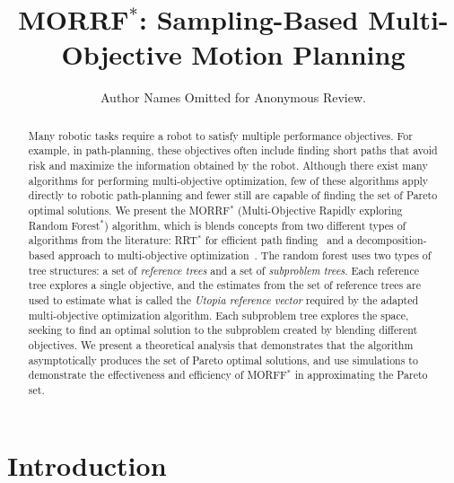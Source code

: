 \documentclass{article}
\title{ MORRF$^*$: Sampling-Based Multi-Objective Motion Planning }
\author{Author Names Omitted for Anonymous Review.}
\begin{document}
\maketitle

\begin{abstract}
Many robotic tasks require a robot to satisfy multiple performance objectives.  
For example, in path-planning, these objectives often include finding short paths that avoid risk and maximize the information obtained by the robot.  
Although there exist many algorithms for performing multi-objective optimization, few of these algorithms apply directly to robotic path-planning and fewer still are capable of finding the set of Pareto optimal solutions.  
We present the MORRF$^{*}$ (Multi-Objective Rapidly exploring Random Forest$^{*}$) algorithm, which is blends concepts from two different types of algorithms from the literature: RRT$^{*}$ for efficient path finding~\cite{Karaman.Frazzoli:RSS10} and a decomposition-based approach to multi-objective optimization~\cite{4358754}.  
The random forest uses two types of tree structures: a set of {\em reference trees} and a set of {\em subproblem trees}.  
Each reference tree explores a single objective, and the estimates from the set of reference trees are used to estimate what is called the {\em Utopia reference vector} required by the adapted multi-objective optimization algorithm.  
Each subproblem tree explores the space, seeking to find an optimal solution to the subproblem created by blending different objectives.  
We present a theoretical analysis that demonstrates that the algorithm asymptotically produces the set of Pareto optimal solutions, and use simulations to demonstrate the effectiveness and efficiency of MORFF$^{*}$ in approximating the Pareto set.
\end{abstract}

\section{Introduction}
\label{sec:intro}
\end{document}
